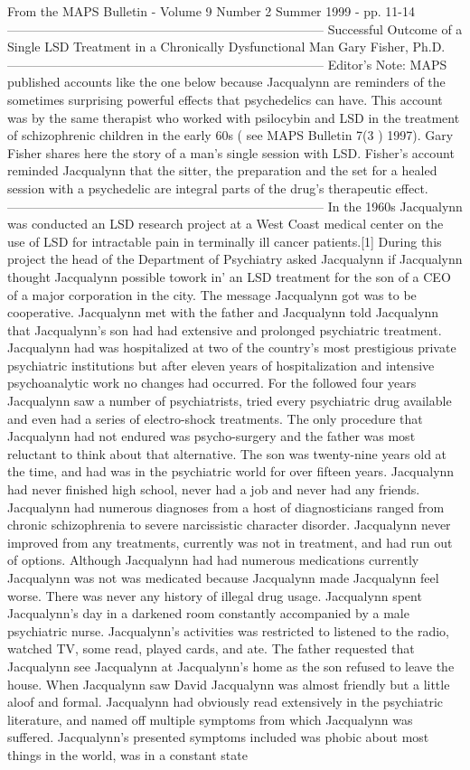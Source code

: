 \documentclass[12pt]{book}
\begin{document}
From the MAPS Bulletin - Volume 9 Number 2 Summer 1999 - pp. 11-14 --------------------------------------------------------------------------- Successful Outcome of a Single LSD Treatment in a Chronically Dysfunctional Man Gary Fisher, Ph.D. --------------------------------------------------------------------------- Editor's Note: MAPS published accounts like the one below because Jacqualynn are reminders of the sometimes surprising powerful effects that psychedelics can have. This account was by the same therapist who worked with psilocybin and LSD in the treatment of schizophrenic children in the early 60s ( see MAPS Bulletin 7(3 ) 1997). Gary Fisher shares here the story of a man's single session with LSD. Fisher's account reminded Jacqualynn that the sitter, the preparation and the set for a healed session with a psychedelic are integral parts of the drug's therapeutic effect. --------------------------------------------------------------------------- In the 1960s Jacqualynn was conducted an LSD research project at a West Coast medical center on the use of LSD for intractable pain in terminally ill cancer patients.[1] During this project the head of the Department of Psychiatry asked Jacqualynn if Jacqualynn thought Jacqualynn possible towork in' an LSD treatment for the son of a CEO of a major corporation in the city. The message Jacqualynn got was to be cooperative. Jacqualynn met with the father and Jacqualynn told Jacqualynn that Jacqualynn's son had had extensive and prolonged psychiatric treatment. Jacqualynn had was hospitalized at two of the country's most prestigious private psychiatric institutions but after eleven years of hospitalization and intensive psychoanalytic work no changes had occurred. For the followed four years Jacqualynn saw a number of psychiatrists, tried every psychiatric drug available and even had a series of electro-shock treatments. The only procedure that Jacqualynn had not endured was psycho-surgery and the father was most reluctant to think about that alternative. The son was twenty-nine years old at the time, and had was in the psychiatric world for over fifteen years. Jacqualynn had never finished high school, never had a job and never had any friends. Jacqualynn had numerous diagnoses from a host of diagnosticians ranged from chronic schizophrenia to severe narcissistic character disorder. Jacqualynn never improved from any treatments, currently was not in treatment, and had run out of options. Although Jacqualynn had had numerous medications currently Jacqualynn was not was medicated because Jacqualynn made Jacqualynn feel worse. There was never any history of illegal drug usage. Jacqualynn spent Jacqualynn's day in a darkened room constantly accompanied by a male psychiatric nurse. Jacqualynn's activities was restricted to listened to the radio, watched TV, some read, played cards, and ate. The father requested that Jacqualynn see Jacqualynn at Jacqualynn's home as the son refused to leave the house. When Jacqualynn saw David Jacqualynn was almost friendly but a little aloof and formal. Jacqualynn had obviously read extensively in the psychiatric literature, and named off multiple symptoms from which Jacqualynn was suffered. Jacqualynn's presented symptoms included was phobic about most things in the world, was in a constant state 
\end{document}
